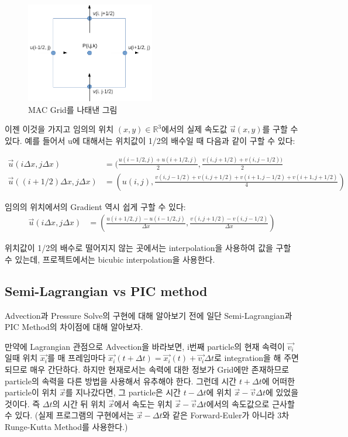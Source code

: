 \documentclass[10pt, A4]{article}
\begin{document}
\begin{figure}[h]
\centering
\includegraphics[width=0.5\textwidth]{mac_grid}
\caption{MAC Grid를 나태낸 그림}
\end{figure}

이젠 이것을 가지고 임의의 위치 $(x, y) \in \mathbb{R}^3$에서의 실제 속도값 $\vec{u}(x, y)$를 구할 수 있다. 예를 들어서 u에 대해서는 위치값이 1/2의 배수일 때 다음과 같이 구할 수 있다:

\begin{align*} 
  \vec{u}(i \Delta x, j \Delta x) &= (\frac{u(i-1/2, j) + u(i+1/2, j)}{2}, \frac{v(i,j+1/2) + v(i,j-1/2))}{2} \\
  \vec{u}((i+1/2) \Delta x, j \Delta x) &= (u(i,j), \frac{v(i,j-1/2) + v(i,j+1/2) + v(i+1,j-1/2) + v(i+1,j+1/2)}{4})
\end{align*}

임의의 위치에서의 Gradient 역시 쉽게 구할 수 있다:
\begin{align*}
  \vec{u}(i \Delta x, j \Delta x) &= (\frac{u(i+1/2, j) - u(i-1/2, j)}{\Delta x}, \frac{v(i,j+1/2) - v(i,j-1/2)}{\Delta x})
\end{align*}

위치값이 1/2의 배수로 떨어지지 않는 곳에서는 interpolation을 사용하여 값을 구할 수 있는데, 프로젝트에서는 bicubic interpolation을 사용한다.

\subsection{Semi-Lagrangian vs PIC method}

Advection과 Pressure Solve의 구현에 대해 알아보기 전에 일단 Semi-Lagrangian과 PIC Method의 차이점에 대해 알아보자.

만약에 Lagrangian 관점으로 Advection을 바라보면, i번째 particle의 현재 속력이 $\vec{v_i}$일때 위치 $\vec{x_i}$를 매 프레임마다 $\vec{x_i}(t + \Delta t) = \vec{x_i}(t) + \vec{v_i} \Delta t$로 integration을 해 주면 되므로 매우 간단하다. 하지만 현재로서는 속력에 대한 정보가 Grid에만 존재하므로 particle의 속력을 다른 방법을 사용해서 유추해야 한다. 그런데 시간 $t + \Delta t$에 어떠한 particle이 위치 $\vec{x}$를 지나갔다면, 그 particle은 시간 $t - \Delta t$에 위치 $\vec{x} - \vec{v} \Delta t$에 있었을 것이다. 즉 $\Delta t$의 시간 뒤 위치 $\vec{x}$에서 속도는 위치 $\vec{x} - \vec{v} \Delta t$에서의 속도값으로 근사할 수 있다. (실제 프로그램의 구현에서는 $\vec{x} - \Delta t$와 같은 Forward-Euler가 아니라 3차 Runge-Kutta Method를 사용한다.)
\end{document}
